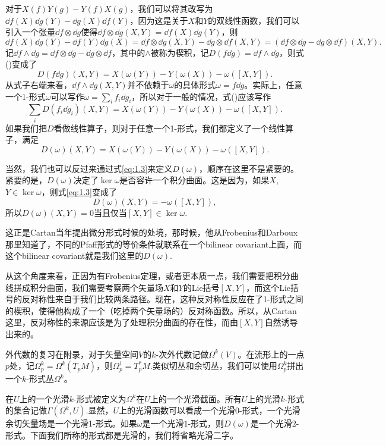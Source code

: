 对于$X(f)Y(g)-Y(f)X(g)$，我们可以将其改写为$\dd f(X)\dd g(Y)-\dd g(X)\dd f(Y)$，因为这是关于$X$和$Y$的双线性函数，我们可以引入一个张量$\dd f\otimes \dd g$使得$\dd f\otimes \dd g(X,Y)=\dd f(X)\dd g(Y)$，则
\[
	\dd f(X)\dd g(Y)-\dd f(Y)\dd g(X)=\dd f\otimes \dd g(X,Y)-\dd g\otimes \dd f(X,Y)=(\dd f\otimes \dd g-\dd g\otimes \dd f)(X,Y).
\]
记$\dd f\wedge \dd g=\dd f\otimes \dd g-\dd g\otimes \dd f$，其中的$\wedge$被称为{\kaishu 楔积}，记$D(f\dd g)=\dd f\wedge \dd g$，则式(\theequation)变成了
\[
	D(f\dd g)(X,Y)=X(\omega(Y))-Y(\omega(X))-\omega([X,Y]).
\]
从式子右端来看，$\dd f\wedge \dd g(X,Y)$并不依赖于$\omega$的具体形式$\omega=f\dd g$。实际上，任意一个1-形式$\omega$可以写作$\omega=\sum_i f_i\dd g_i$，所以对于一般的情况，式(\theequation)应该写作
\[
	\sum_iD(f_i\dd g_i)(X,Y)=X(\omega(Y))-Y(\omega(X))-\omega([X,Y]).
\]
如果我们把$D$看做线性算子，则对于任意一个1-形式，我们都定义了一个线性算子，满足
\begin{equation}
	D(\omega)(X,Y)=X(\omega(Y))-Y(\omega(X))-\omega([X,Y]).
	\label{eq:1.3}
\end{equation}

\para 当然，我们也可以反过来通过式\eqref{eq:1.3}来定义$D(\omega)$，顺序在这里不是紧要的。紧要的是，$D(\omega)$决定了$\ker \omega$是否容许一个积分曲面。这是因为，如果$X$, $Y\in \ker \omega$，则式\eqref{eq:1.3}变成了
\[
	D(\omega)(X,Y)=-\omega([X,Y]),
\]
所以$D(\omega)(X,Y)=0$当且仅当$[X,Y]\in \ker \omega$.

这正是Cartan当年提出微分形式时候的处境，那时候，他从Frobenius和Darboux那里知道了，不同的Pfaff形式的等价条件就联系在一个bilinear covariant上面，而这个bilinear covariant就是我们这里的$D(\omega)$.

从这个角度来看，正因为有Frobenius定理，或者更本质一点，我们需要把积分曲线拼成积分曲面，我们需要考察两个矢量场$X$和$Y$的Lie括号$[X,Y]$，而这个Lie括号的反对称性来自于我们比较两条路径。现在，这种反对称性反应在了1-形式之间的楔积，使得他构成了一个（吃掉两个矢量场的）反对称函数。所以，从Cartan这里，反对称性的来源应该是为了处理积分曲面的存在性，而由$[X,Y]$自然诱导出来的。

\para 外代数的复习在附录，对于矢量空间$V$的$k$-次外代数记做$\Omega^k(V)$。在流形上的一点$p$处，记$\Omega_p^k=\Omega^k(T_pM)$，则$\Omega_p^1=T_p^*M$.类似切丛和余切丛，我们可以使用$\Omega_p^k$拼出一个$k$-形式丛$\Omega^k$。

\para 在$U$上的一个光滑$k$-形式被定义为$\Omega^k$在$U$上的一个光滑截面。所有$U$上的光滑$k$-形式的集合记做$\Gamma(\Omega^k,U)$.显然，$U$上的光滑函数可以看成一个光滑$0$-形式，一个光滑余切矢量场是一个光滑1-形式。如果$\omega$是一个光滑$1$-形式，则$D(\omega)$是一个光滑$2$-形式。下面我们所称的形式都是光滑的，我们将省略光滑二字。

